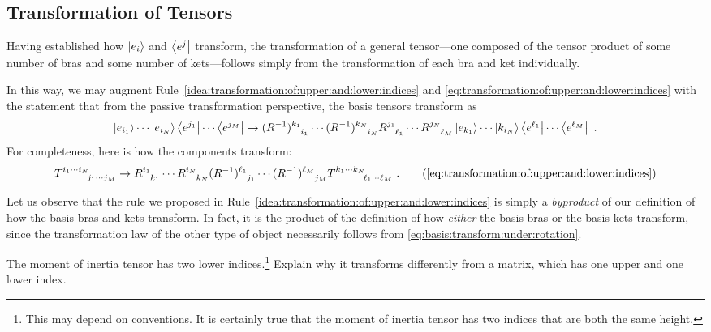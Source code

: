 \documentclass[12pt, oneside]{report}    %
\newenvironment{wide}{\begin{adjustwidth}{0cm}{-6.25cm}}{\end{adjustwidth}}
\begin{document}
\subsection{Transformation of Tensors}

Having established how $\left|e_i\right\rangle$ and $\left\langle e^j\right|$ transform, the transformation of a general tensor---one composed of the tensor product of some number of bras and some number of kets---follows simply from the transformation of each bra and ket individually.

\begin{wide}
In this way, we may augment Rule~\ref{idea:transformation:of:upper:and:lower:indices} and \eqref{eq:transformation:of:upper:and:lower:indices} with the statement that from the passive transformation perspective, the basis tensors transform as
\begin{align}
    \ket{e_{i_1}} \cdots \ket{e_{i_N}}
    \bra{e^{j_1}} \cdots \bra{e^{j_M}}
    \to 
    (R\inv)\aij{k_1}{i_1}\cdots (R\inv)\aij{k_N}{i_N}
    R\aij{j_1}{\ell_1}\cdots R\aij{j_N}{\ell_M}
    \ket{e_{k_1}} \cdots \ket{k_{i_N}}
    \bra{e^{\ell_1}} \cdots \bra{e^{\ell_M}} \ .
\end{align}
For completeness, here is how the components transform:
\begin{align}
    T\aij{i_1\cdots i_N}{j_1\cdots j_M}
    \to 
    R\aij{i_1}{k_1}\cdots R\aij{i_N}{k_N}
    (R\inv)\aij{\ell_1}{j_1}\cdots (R\inv)\aij{\ell_M}{j_M}
    T\aij{k_1\cdots k_N}{\ell_1\cdots \ell_M} \ .
    \tag{\ref{eq:transformation:of:upper:and:lower:indices}}
\end{align}
\end{wide}

Let us observe that the rule we proposed in Rule~\ref{idea:transformation:of:upper:and:lower:indices} is simply a \emph{byproduct} of our definition of how the basis bras and kets transform. In fact, it is the product of the definition of how \emph{either} the basis bras or the basis kets transform, since the transformation law of the other type of object necessarily follows from \eqref{eq:basis:transform:under:rotation}.

\begin{example}
The moment of inertia tensor has two lower indices.\footnote{This may depend on conventions. It is certainly true that the moment of inertia tensor has two indices that are both the same height.} Explain why it transforms differently from a matrix, which has one upper and one lower index.
\end{example}
\end{document}

